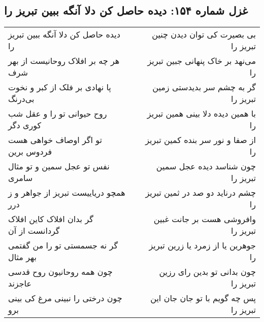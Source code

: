 \begin{center}
\section*{غزل شماره ۱۵۴: دیده حاصل کن دلا آنگه ببین تبریز را}
\label{sec:0154}
\begin{longtable}{l p{0.5cm} r}
دیده حاصل کن دلا آنگه ببین تبریز را
&&
بی بصیرت کی توان دیدن چنین تبریز را
\\
هر چه بر افلاک روحانیست از بهر شرف
&&
می‌نهد بر خاک پنهانی جبین تبریز را
\\
پا نهادی بر فلک از کبر و نخوت بی‌درنگ
&&
گر به چشم سر بدیدستی زمین تبریز را
\\
روح حیوانی تو را و عقل شب کوری دگر
&&
با همین دیده دلا بینی همین تبریز را
\\
تو اگر اوصاف خواهی هست فردوس برین
&&
از صفا و نور سر بنده کمین تبریز را
\\
نفس تو عجل سمین و تو مثال سامری
&&
چون شناسد دیده عجل سمین تبریز را
\\
همچو دریاییست تبریز از جواهر و ز درر
&&
چشم درناید دو صد در ثمین تبریز را
\\
گر بدان افلاک کاین افلاک گردانست از آن
&&
وافروشی هست بر جانت غبین تبریز را
\\
گر نه جسمستی تو را من گفتمی بهر مثال
&&
جوهرین یا از زمرد یا زرین تبریز را
\\
چون همه روحانیون روح قدسی عاجزند
&&
چون بدانی تو بدین رای رزین تبریز را
\\
چون درختی را نبینی مرغ کی بینی برو
&&
پس چه گویم با تو جان جان این تبریز را
\\
\end{longtable}
\end{center}
